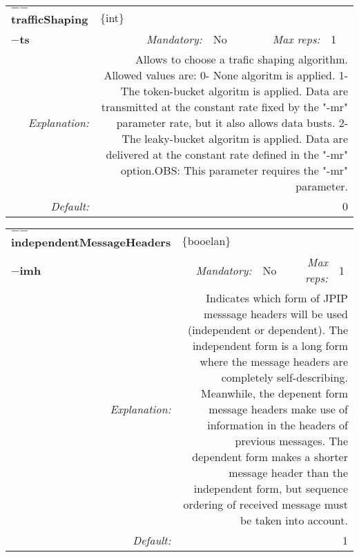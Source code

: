 \begin{center}\begin{tabular}{|rr|rl|rl|}
\hline
\multicolumn{2}{|l|}{\textbf{$-$$-$trafficShaping}} & \multicolumn{4}{|l|}{$\{$int$\}$} \\
\cline{3-6}
\multicolumn{2}{|l|}{\textbf{$-$ts}} & \emph{Mandatory:} & No & \emph{Max reps:} & 1 \\
\hline
\emph{Explanation:} & \multicolumn{5}{|p{12cm}|}{Allows to choose a trafic shaping algorithm. Allowed values are:	0- None algoritm is applied.	1- The token-bucket algoritm is applied. Data are transmitted at the constant rate fixed by the "-mr" parameter rate, but it also allows data busts.	2- The leaky-bucket algoritm is applied. Data are delivered at the constant rate defined in the "-mr" option.OBS: This parameter requires the "-mr" parameter.} \\
\hline
\emph{Default:} & \multicolumn{5}{|p{12cm}|}{0} \\
\hline
\end{tabular}\end{center}
\begin{center}\begin{tabular}{|rr|rl|rl|}
\hline
\multicolumn{2}{|l|}{\textbf{$-$$-$independentMessageHeaders}} & \multicolumn{4}{|l|}{$\{$booelan$\}$} \\
\cline{3-6}
\multicolumn{2}{|l|}{\textbf{$-$imh}} & \emph{Mandatory:} & No & \emph{Max reps:} & 1 \\
\hline
\emph{Explanation:} & \multicolumn{5}{|p{12cm}|}{Indicates which form of JPIP messsage headers will be used (independent or dependent). The independent form is a long form where the message headers are completely self-describing. Meanwhile, the depenent form message headers make use of information in the headers of previous messages. The dependent form makes a shorter message header than the independent form, but sequence ordering of received message must be taken into account.} \\
\hline
\emph{Default:} & \multicolumn{5}{|p{12cm}|}{1} \\
\hline
\end{tabular}\end{center}

